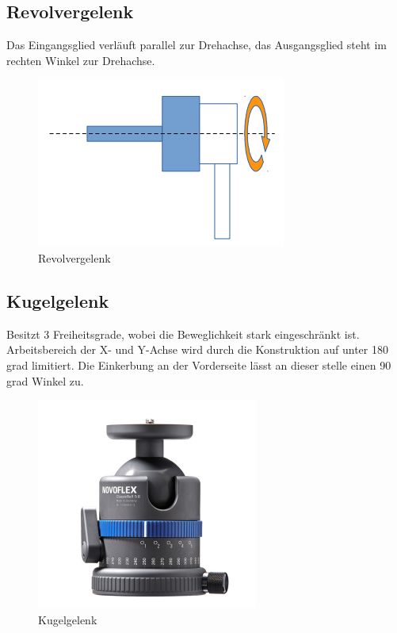 \subsection{Revolvergelenk}
Das Eingangsglied verläuft parallel zur Drehachse, das Ausgangsglied steht im rechten Winkel zur Drehachse.
\begin{figure}[H]
	\begin{center}
		\includegraphics[scale=0.6]{Resources/PNG/Revolvergelenk}
		\caption{Revolvergelenk}
		\label{fig:Resources/PNG/Revolvergelenk}
	\end{center}
\end{figure}
\subsection{Kugelgelenk}
Besitzt 3 Freiheitsgrade, wobei die Beweglichkeit stark eingeschränkt ist.
Arbeitsbereich der X- und Y-Achse wird durch die Konstruktion auf unter 
180 grad limitiert.
Die Einkerbung an der Vorderseite lässt an dieser stelle einen 90 grad Winkel zu.
\begin{figure}[H]
	\begin{center}
		\includegraphics[scale=0.8]{Resources/PNG/Kugelgelenk.PNG}
		\caption{Kugelgelenk}
		\label{fig:Resources/PNG/Kugelgelenk.PNG}
	\end{center}
\end{figure}
